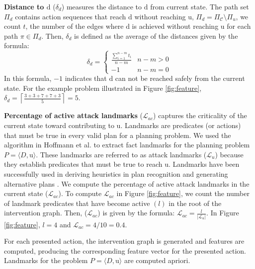 \documentclass[doctor]{thesis} %
\theoremstyle{plain}
\begin{document}
\textbf{Distance to $\boldsymbol{\mathrm{d}}$} ($\delta_d$) measures the distance to $\mathrm{d}$ from current state. The path set $\Pi_{d}$ contains action sequences that reach $\mathrm{d}$ without reaching $\mathrm{u}$, $\Pi_{d} = \Pi_{\mathcal{C}} \setminus \Pi_{u} $, we count  $t$, the number of the edges where $\mathrm{d}$ is achieved without reaching $\mathrm{u}$ for each path $\pi \in \Pi_{d}$. Then, $\delta_d$ is defined as the average of the distances given by the formula:
\begin{equation*} 
\delta_d = \left\{\begin{matrix}
\frac{\sum_{i=1}^{n-m}t_i}{n-m} & n-m>0\\ 
-1 &  n-m=0
\end{matrix}\right.
\end{equation*}
In this formula, $-1$ indicates that $\mathrm{d}$ can not be reached safely from the current state. For the example problem illustrated in Figure \ref{fig:feature}, $\delta_d=\left \lceil \frac{3+3+7+7+3}{5} \right \rceil=5$.

\textbf{Percentage of active attack landmarks} ($\mathcal{L}_{ac}$) captures the criticality of the current state toward contributing to $\mathrm{u}$. 
Landmarks \cite{hoffman2004lm} are predicates (or actions) that must be true in every valid plan for a planning problem. We used the algorithm in Hoffmann et al.  to extract fact landmarks for the planning problem $P = \langle D, \mathrm{u}\rangle$. These landmarks are referred to as attack landmarks ($\mathcal{L}_{u}$) because they establish predicates that must be true to reach $\mathrm{u}$.  Landmarks have been successfully used in deriving heuristics in plan recognition \cite{vered2018goalrec} and generating alternative plans \cite{bryce2014diverse}. We compute the percentage of active attack landmarks in the current state ($\mathcal{L}_{ac}$). To compute $\mathcal{L}_{ac}$ in Figure \ref{fig:feature}, we count the number of landmark predicates that have become active $(l)$ in the root of the intervention graph. Then, ($\mathcal{L}_{ac}$) is given by the formula: $\mathcal{L}_{ac} = \frac{l}{\left |\mathcal{L}_{u}\right|}$. In Figure \ref{fig:feature}, $l=4$ and $\mathcal{L}_{ac}=4/10=0.4$.

For each presented action, the intervention graph is generated and features are computed, producing the corresponding feature vector for the presented action. Landmarks for the problem $P = \langle D, \mathrm{u}\rangle$ are computed apriori. 
\end{document}
